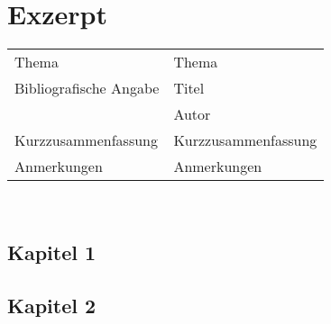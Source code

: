 \section*{Exzerpt}

\begin{tabular*}{1\textwidth}{ l l }
  \hline
    Thema & Thema \\
    Bibliografische Angabe & Titel \\
    & Autor \\
    Kurzzusammenfassung & Kurzzusammenfassung \\  
    Anmerkungen & Anmerkungen \\  
  \hline
\end{tabular*}
\\
\subsection*{Kapitel 1}
\blindtext
\subsection*{Kapitel 2}
\blindtext